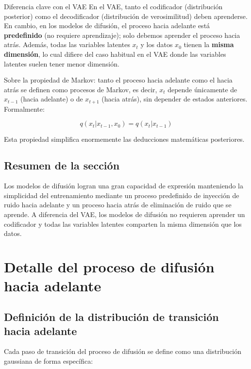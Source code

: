 \documentclass[a4paper]{article}
\begin{document}
\begin{knowledgebox}{Diferencia clave con el VAE}
En el VAE, tanto el codificador (distribución posterior) como el decodificador (distribución de verosimilitud) deben aprenderse. En cambio, en los modelos de difusión, el proceso hacia adelante está \textbf{predefinido} (no requiere aprendizaje); solo debemos aprender el proceso hacia atrás. Además, todas las variables latentes $x_t$ y los datos $x_0$ tienen la \textbf{misma dimensión}, lo cual difiere del caso habitual en el VAE donde las variables latentes suelen tener menor dimensión.
\end{knowledgebox}

Sobre la propiedad de Markov: tanto el proceso hacia adelante como el hacia atrás se definen como procesos de Markov, es decir, $x_t$ depende únicamente de $x_{t-1}$ (hacia adelante) o de $x_{t+1}$ (hacia atrás), sin depender de estados anteriores. Formalmente:

$$q(x_t | x_{t-1}, x_0) = q(x_t | x_{t-1})$$

Esta propiedad simplifica enormemente las deducciones matemáticas posteriores.

\subsection{Resumen de la sección}

Los modelos de difusión logran una gran capacidad de expresión manteniendo la simplicidad del entrenamiento mediante un proceso predefinido de inyección de ruido hacia adelante y un proceso hacia atrás de eliminación de ruido que se aprende. A diferencia del VAE, los modelos de difusión no requieren aprender un codificador y todas las variables latentes comparten la misma dimensión que los datos.



\section{Detalle del proceso de difusión hacia adelante}

\subsection{Definición de la distribución de transición hacia adelante}

Cada paso de transición del proceso de difusión se define como una distribución gaussiana de forma específica:
\end{document}
